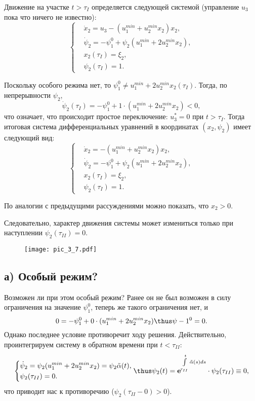 Движение на участке $t > \tau_{I}$ определяется следующей системой (управление $u_3$ пока что ничего не известно):
$$
    \left\{
        \begin{aligned}
            & \dot{x}_2 = u_3 - (u_1^{min} + u_2^{min} x_2) x_2, \\
            & \dot{\psi}_2 = -\psi_1^0 + \psi_2 (u_1^{min} + 2 u_2^{min} x_2), \\
            & x_2(\tau_{I}) = \xi_2, \\
            & \psi_2 (\tau_{I}) = 1.
        \end{aligned}
    \right.
$$

Поскольку особого режима нет, то $\psi_1^0 \neq u_1^{min} + 2 u_2^{min} x_2(\tau_{I})$. Тогда, по непрерывности $\psi_2$,
$$
    \dot{\psi}_2(\tau_{I}) = - \psi_1^0 + 1 \cdot (u_1^{min} + 2 u_2^{min} x_2) < 0,
$$
что означает, что происходит простое переключение: $u_3^* = 0$ при $t > \tau_{I}$. Тогда итоговая система дифференциальных уравнений в координатах $(x_2, \psi_2)$ имеет следующий вид:
$$
    \left\{
        \begin{aligned}
            & \dot{x}_2 = - (u_1^{min} + u_2^{min} x_2) x_2, \\
            & \dot{\psi}_2 = -\psi_1^0 + \psi_2 (u_1^{min} + 2 u_2^{min} x_2), \\
            & x_2(\tau_{I}) = \xi_2, \\
            & \psi_2 (\tau_{I}) = 1.
        \end{aligned}
    \right.
$$

По аналогии с предыдущими рассуждениями можно показать, что $x_2 > 0$.

Следовательно, характер движения системы может измениться только при наступлении $\psi_2(\tau_{II}) = 0$.

\begin{figure}[H]
    \centering
    \texttt{[image: pic\_3\_7.pdf]}
\end{figure}

\subsection*{а) Особый режим?}
Возможен ли при этом особый режим? Ранее он не был возможен в силу ограничения на значение $\psi_1^0$, теперь же такого ограничения нет, и
$$
    0 = -\psi_1^0 + 0 \cdot (u_1^{min} + 2 u_2^{min} x_2) \thus \psi-1^0 = 0.
$$
Однако последнее условие противоречит ходу решения. Действительно, проинтегрируем систему в обратном времени при $t < \tau_{II}$:
$$
    \left\{
        \begin{aligned}
            & \dot{\psi}_2 = \psi_2 (u_1^{min} + 2 u_2^{min} x_2) = \psi_2 \tilde{\alpha}(t), \\
            & \psi_2 (\tau_{II}) = 0.
        \end{aligned}
    \right.
    \thus \psi_2(t) = \mathbf{e}^{\int\limits_{\tau_{II}}^t \tilde{\alpha}(s) ds} \cdot \psi_2 (\tau_{II}) \equiv 0,
$$
что приводит нас к противоречию ($\psi_2(\tau_{II}-0) > 0$).

